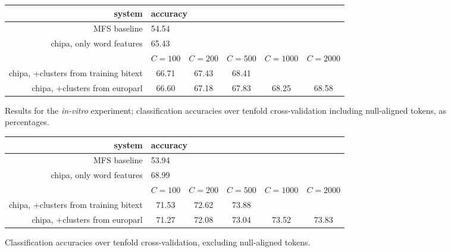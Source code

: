 \documentclass[10pt, a4paper]{article}
\begin{document}
\begin{figure*}[t!]
  \begin{center}
  \begin{tabular}{|r|c|c|c|c|c|}
    \hline
    system                    & \multicolumn{5}{|l|}{accuracy} \\
    \hline
    MFS baseline              &  \multicolumn{5}{|l|}{54.54} \\
    chipa, only word features &  \multicolumn{5}{|l|}{65.43} \\
    \hline
           & $C=100$ & $C=200$ & $C=500$ & $C=1000$ & $C=2000$ \\
    \hline
    chipa, +clusters from training bitext &
    66.71 & 67.43 & 68.41 &       &       \\
    chipa, +clusters from europarl        &
    66.60 & 67.18 & 67.83 & 68.25 & 68.58 \\
    \hline
  \end{tabular}
  \end{center}
\caption{Results for the \emph{in-vitro} experiment; classification accuracies
over tenfold cross-validation including null-aligned tokens, as percentages. }
\label{fig:theresults1}
\end{figure*}

\begin{figure*}[t!]
  \begin{center}
  \begin{tabular}{|r|c|c|c|c|c|}
    \hline
    system                    & \multicolumn{5}{|l|}{accuracy} \\
    \hline
    MFS baseline              &  \multicolumn{5}{|l|}{53.94} \\
    chipa, only word features &  \multicolumn{5}{|l|}{68.99} \\
    \hline
           & $C=100$ & $C=200$ & $C=500$ & $C=1000$ & $C=2000$ \\
    \hline
    chipa, +clusters from training bitext &
    71.53 & 72.62 & 73.88 &       &       \\
    chipa, +clusters from europarl        &
    71.27 & 72.08 & 73.04 & 73.52 & 73.83 \\
    \hline
  \end{tabular}
  \end{center}
\caption{Classification accuracies over tenfold cross-validation, excluding
null-aligned tokens.}
\label{fig:theresults2}
\end{figure*}
\end{document}
